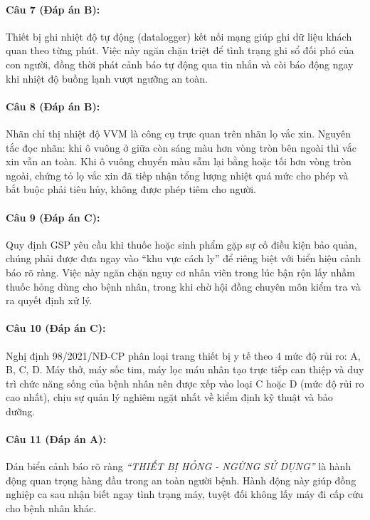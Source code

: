\documentclass[12pt,a4paper]{article}
\begin{document}
\paragraph{\textbf{Câu 7 (Đáp án B):}} Thiết bị ghi nhiệt độ tự động (datalogger) kết nối mạng giúp ghi dữ liệu khách quan theo từng phút. Việc này ngăn chặn triệt để tình trạng ghi sổ đối phó của con người, đồng thời phát cảnh báo tự động qua tin nhắn và còi báo động ngay khi nhiệt độ buồng lạnh vượt ngưỡng an toàn.

\paragraph{\textbf{Câu 8 (Đáp án B):}} Nhãn chỉ thị nhiệt độ VVM là công cụ trực quan trên nhãn lọ vắc xin. Nguyên tắc đọc nhãn: khi ô vuông ở giữa còn sáng màu hơn vòng tròn bên ngoài thì vắc xin vẫn an toàn. Khi ô vuông chuyển màu sẫm lại bằng hoặc tối hơn vòng tròn ngoài, chứng tỏ lọ vắc xin đã tiếp nhận tổng lượng nhiệt quá mức cho phép và bắt buộc phải tiêu hủy, không được phép tiêm cho người.

\paragraph{\textbf{Câu 9 (Đáp án C):}} Quy định GSP yêu cầu khi thuốc hoặc sinh phẩm gặp sự cố điều kiện bảo quản, chúng phải được đưa ngay vào ``khu vực cách ly'' để riêng biệt với biển hiệu cảnh báo rõ ràng. Việc này ngăn chặn nguy cơ nhân viên trong lúc bận rộn lấy nhầm thuốc hỏng dùng cho bệnh nhân, trong khi chờ hội đồng chuyên môn kiểm tra và ra quyết định xử lý.

\paragraph{\textbf{Câu 10 (Đáp án C):}} Nghị định 98/2021/NĐ-CP phân loại trang thiết bị y tế theo 4 mức độ rủi ro: A, B, C, D. Máy thở, máy sốc tim, máy lọc máu nhân tạo trực tiếp can thiệp và duy trì chức năng sống của bệnh nhân nên được xếp vào loại C hoặc D (mức độ rủi ro cao nhất), chịu sự quản lý nghiêm ngặt nhất về kiểm định kỹ thuật và bảo dưỡng.

\paragraph{\textbf{Câu 11 (Đáp án A):}} Dán biển cảnh báo rõ ràng \textit{``THIẾT BỊ HỎNG - NGỪNG SỬ DỤNG''} là hành động quan trọng hàng đầu trong an toàn người bệnh. Hành động này giúp đồng nghiệp ca sau nhận biết ngay tình trạng máy, tuyệt đối không lấy máy đi cấp cứu cho bệnh nhân khác.
\end{document}
